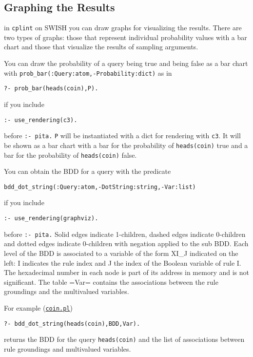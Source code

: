 \subsection{Graphing the Results}
\label{graphing}

in \texttt{cplint} on SWISH you can draw graphs
for visualizing the results. There are two types 
of graphs: those that represent individual probability values with a bar chart and those that 
visualize the results of sampling arguments.

You can draw the probability of a query being true and 
being false as a bar chart with \verb|prob_bar(:Query:atom,-Probability:dict)| as in
\begin{verbatim}
?- prob_bar(heads(coin),P).
\end{verbatim}
if you include
\begin{verbatim}
:- use_rendering(c3).
\end{verbatim}
before \verb|:- pita.| \verb|P| will be instantiated with a
dict for rendering with \verb|c3|. It will be shown as a bar chart with
a bar for the probability of \verb|heads(coin)| true and a bar for the probability of \verb|heads(coin)| false.

You can obtain the BDD for a query with the predicate
\begin{verbatim}
bdd_dot_string(:Query:atom,-DotString:string,-Var:list)
\end{verbatim}
if you include
\begin{verbatim}
:- use_rendering(graphviz).
\end{verbatim}
before \verb|:- pita.| 
Solid edges indicate 1-children, dashed edges indicate 0-children and dotted
edges indicate 0-children with negation applied to the sub BDD.
Each level of the BDD is associated to a variable of the form XI\_J indicated on the left:
I indicates the rule index and J the index of the Boolean variable of rule I.
The hexadecimal number in each node is part of its address in memory and is not significant.
The table =Var= contains the associations between the rule groundings and the
multivalued variables.

For example (\href{http://cplint.lamping.unife.it/example/inference/coin.pl}{\texttt{coin.pl}})
\begin{verbatim}
?- bdd_dot_string(heads(coin),BDD,Var).
\end{verbatim}
returns the BDD for the query \verb|heads(coin)| and the list of associations between rule groundings and
multivalued variables.

